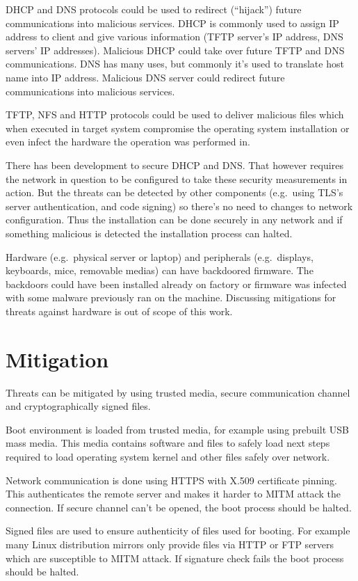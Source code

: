 DHCP and DNS protocols could be used to redirect (``hijack'') future
communications into malicious services. DHCP is commonly used to
assign IP address to client and give various information (TFTP
server's IP address, DNS servers' IP addresses). Malicious DHCP could
take over future TFTP and DNS communications. DNS has many uses, but
commonly it's used to translate host name into IP address. Malicious
DNS server could redirect future communications into malicious
services.

TFTP, NFS and HTTP protocols could be used to deliver malicious files
which when executed in target system compromise the operating system
installation or even infect the hardware the operation was performed
in.

There has been development to secure DHCP and DNS\@. That however
requires the network in question to be configured to take these
security measurements in action. But the threats can be detected by
other components (e.g.\ using TLS's server authentication, and code
signing) so there's no need to changes to network configuration. Thus
the installation can be done securely in any network and if something
malicious is detected the installation process can halted.

Hardware (e.g.\ physical server or laptop) and peripherals
(e.g.\ displays, keyboards, mice, removable medias) can have backdoored
firmware. The backdoors could have been installed already on factory
or firmware was infected with some malware previously ran on the
machine. Discussing mitigations for threats against hardware is out of
scope of this work.


\section{Mitigation}

Threats can be mitigated by using trusted media, secure communication
channel and cryptographically signed files.

Boot environment is loaded from trusted media, for example using
prebuilt USB mass media. This media contains software and files to
safely load next steps required to load operating system kernel and
other files safely over network.

Network communication is done using HTTPS with X.509 certificate
pinning. This authenticates the remote server and makes it harder to
MITM attack the connection. If secure channel can't be opened, the
boot process should be halted.

Signed files are used to ensure authenticity of files used for
booting. For example many Linux distribution mirrors only provide
files via HTTP or FTP servers which are susceptible to MITM attack. If
signature check fails the boot process should be halted.
